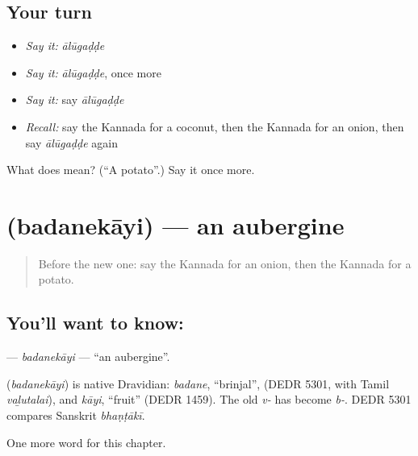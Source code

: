 \subsection*{Your turn}
\begin{itemize}
\raggedright
  \item \emph{Say it:} \emph{ālūgaḍḍe}
  \item \emph{Say it:} \emph{ālūgaḍḍe}, once more
  \item \emph{Say it:} say \emph{ālūgaḍḍe}
  \item \emph{Recall:} say the Kannada for a coconut, then the Kannada for an onion, then say \emph{ālūgaḍḍe} again
\end{itemize}

\begin{tcolorbox}[breakable,colback=teal!4,colframe=teal!35!black,title={Before you move on}]
What does  mean? (\textquotedblleft{}A potato\textquotedblright{}.) Say it once more.
\end{tcolorbox}
\section[\texorpdfstring{\kn{ಬದನೆಕಾಯಿ} (badanekāyi)}{ಬದನೆಕಾಯಿ (badanekāyi)}]{ (badanekāyi) — an aubergine}

\label{lesson:KA-C124-badanekayi}



\begin{quote}
Before the new one: say the Kannada for an onion, then the Kannada for a potato.
\end{quote}

\subsection*{You'll want to know: }
\textbf{} — \emph{badanekāyi} — \textquotedblleft{}an aubergine\textquotedblright{}.

\begin{cousinweb}
\textbf{} (\emph{badanekāyi}) is native Dravidian: \emph{badane}, \textquotedblleft{}brinjal\textquotedblright{}, (DEDR 5301, with Tamil \emph{vaḻutalai}), and \emph{kāyi}, \textquotedblleft{}fruit\textquotedblright{} (DEDR 1459). The old \emph{v-} has become \emph{b-}. DEDR 5301 compares Sanskrit \emph{bhaṇṭākī}.
\end{cousinweb}

\begin{grammarlens}[title={What you've built}]
One more word for this chapter.
\end{grammarlens}

